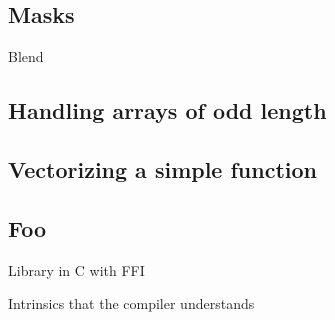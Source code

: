\documentclass{article}
\begin{document}
\subsection{Masks}

Blend

\subsection{Handling arrays of odd length}






\subsection{Vectorizing a simple function}




\subsection{Foo}

Library in C with FFI

Intrinsics that the compiler understands
\end{document}
